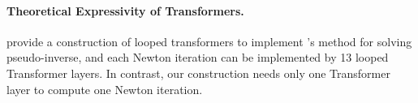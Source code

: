 \paragraph{Theoretical Expressivity of Transformers. } \citet{pmlr-v202-giannou23a} provide a construction of looped transformers to implement \newton's method for solving pseudo-inverse, and each Newton iteration can be implemented by 13 looped Transformer layers. In contrast, our construction needs only one Transformer layer to compute one Newton iteration.
